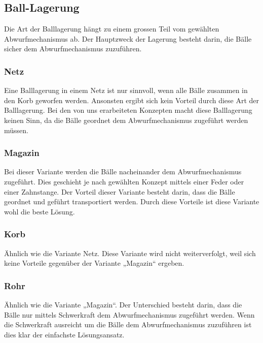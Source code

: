 \subsection{Ball-Lagerung}
Die Art der Balllagerung hängt zu einem grossen Teil vom gewählten Abwurfmechanismus ab. Der Hauptzweck der Lagerung besteht darin, die Bälle sicher dem Abwurfmechanismus zuzuführen. 

\subsubsection{Netz}
Eine Balllagerung in einem Netz ist nur sinnvoll, wenn alle Bälle zusammen in den Korb geworfen werden. Ansonsten ergibt sich kein Vorteil durch diese Art der Balllagerung. Bei den von uns erarbeiteten Konzepten macht diese Balllagerung keinen Sinn, da die Bälle geordnet dem Abwurfmechanismus zugeführt werden müssen.

\subsubsection{Magazin}
Bei dieser Variante werden die Bälle nacheinander dem Abwurfmechanismus zugeführt. Dies geschieht je nach gewählten Konzept mittels einer Feder oder einer Zahnstange. Der Vorteil dieser Variante besteht darin, dass die Bälle geordnet und geführt transportiert werden. Durch diese Vorteile ist diese Variante wohl die beste Lösung.

\subsubsection{Korb}
Ähnlich wie die Variante Netz. Diese Variante wird nicht weiterverfolgt, weil sich keine Vorteile gegenüber der Variante „Magazin“ ergeben.

\subsubsection{Rohr}
Ähnlich wie die Variante „Magazin“. Der Unterschied besteht darin, dass die Bälle nur mittels Schwerkraft dem Abwurfmechanismus zugeführt werden. Wenn die Schwerkraft ausreicht um die Bälle dem Abwurfmechanismus zuzuführen ist dies klar der einfachste Lösungsansatz.